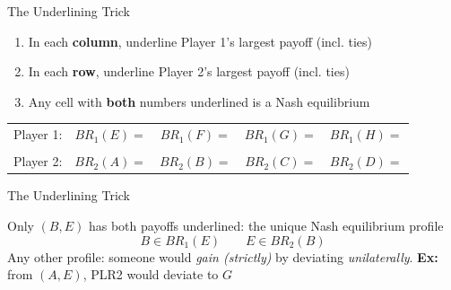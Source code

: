 \begin{frame}{The Underlining Trick}
\begin{enumerate}
    \item In each \textbf{column}, underline Player 1's largest payoff (incl. ties)
    \item In each \textbf{row}, underline Player 2's largest payoff (incl. ties)
    \item Any cell with \textbf{both} numbers underlined is a Nash equilibrium
\end{enumerate}
\centering
\begin{matrixgame}[top={E, F, G, H}, left={A, B, C, D}, player names={Player 1, Player 2}]
\end{matrixgame}

\begin{tabular}{ccccc}
{\color{player1}Player 1:} & $BR_1(E)=$\hspace{0.40in} & $BR_1(F)=$\hspace{0.40in} & $BR_1(G)=$\hspace{0.40in} & $BR_1(H)=$\hspace{0.40in} \\
 & & & & \\
{\color{player2}Player 2:} & $BR_2(A)=$\hspace{0.40in} & $BR_2(B)=$\hspace{0.40in} & $BR_2(C)=$\hspace{0.40in} & $BR_2(D)=$\hspace{0.40in}
\end{tabular}
\end{frame}

\begin{frame}{The Underlining Trick}
\centering
\begin{matrixgame}[top={E, F, G, H}, left={A, B, C, D}, player names={Player 1, Player 2}, br]
\end{matrixgame}
\bsk
\raggedright
Only $(B,E)$ has both payoffs underlined: the unique Nash equilibrium profile\\
$$
B \in BR_1(E) \quad \quad E\in BR_2(B)
$$
Any other profile: someone would \textit{gain (strictly)} by deviating \textit{unilaterally}.
\bsk
\textbf{Ex:} from $(A,E)$, PLR2 would deviate to $G$
\end{frame}

